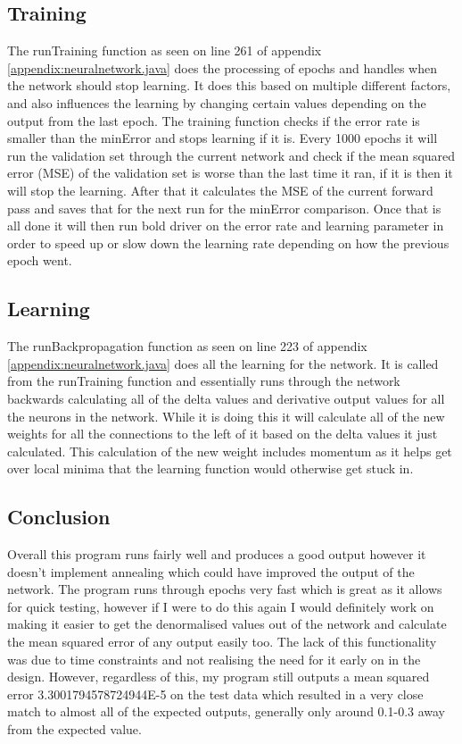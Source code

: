 \documentclass[10pt, a4paper]{article}
\begin{document}
\subsection{Training}
The runTraining function as seen on line 261 of appendix \ref{appendix:neuralnetwork.java} does the processing of epochs and handles when the network should stop learning. It does this based on multiple different factors, and also influences the learning by changing certain values depending on the output from the last epoch. The training function checks if the error rate is smaller than the minError and stops learning if it is. Every 1000 epochs it will run the validation set through the current network and check if the mean squared error (MSE) of the validation set is worse than the last time it ran, if it is then it will stop the learning. After that it calculates the MSE of the current forward pass and saves that for the next run for the minError comparison. Once that is all done it will then run bold driver on the error rate and learning parameter in order to speed up or slow down the learning rate depending on how the previous epoch went.

\subsection{Learning}
The runBackpropagation function as seen on line 223 of appendix \ref{appendix:neuralnetwork.java} does all the learning for the network. It is called from the runTraining function and essentially runs through the network backwards calculating all of the delta values and derivative output values for all the neurons in the network. While it is doing this it will calculate all of the new weights for all the connections to the left of it based on the delta values it just calculated. This calculation of the new weight includes momentum as it helps get over local minima that the learning function would otherwise get stuck in.

\subsection{Conclusion}
Overall this program runs fairly well and produces a good output however it doesn't implement annealing which could have improved the output of the network. The program runs through epochs very fast which is great as it allows for quick testing, however if I were to do this again I would definitely work on making it easier to get the denormalised values out of the network and calculate the mean squared error of any output easily too. The lack of this functionality was due to time constraints and not realising the need for it early on in the design. However, regardless of this, my program still outputs a mean squared error 3.3001794578724944E-5 on the test data which resulted in a very close match to almost all of the expected outputs, generally only around 0.1-0.3 away from the expected value.
\end{document}
